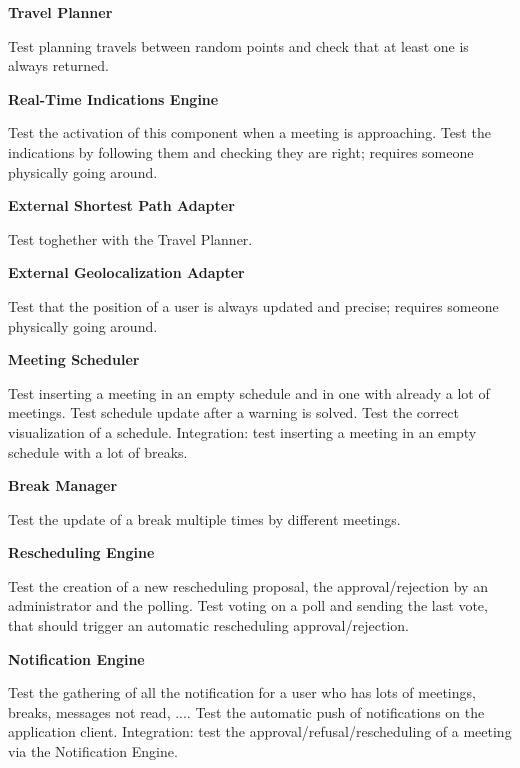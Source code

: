 \textbf{Travel Planner}

Test planning travels between random points and check that at least one is always returned.

\textbf{Real-Time Indications Engine}

Test the activation of this component when a meeting is approaching.
Test the indications by following them and checking they are right; requires someone physically going around.

\textbf{External Shortest Path Adapter}

Test toghether with the Travel Planner.

\textbf{External Geolocalization Adapter}

Test that the position of a user is always updated and precise; requires someone physically going around.

\textbf{Meeting Scheduler}

Test inserting a meeting in an empty schedule and in one with already a lot of meetings.
Test schedule update after a warning is solved.
Test the correct visualization of a schedule.
Integration: test inserting a meeting in an empty schedule with a lot of breaks.

\textbf{Break Manager}

Test the update of a break multiple times by different meetings.

\textbf{Rescheduling Engine}

Test the creation of a new rescheduling proposal, the approval/rejection by an administrator and the polling.
Test voting on a poll and sending the last vote, that should trigger an automatic rescheduling approval/rejection.

\textbf{Notification Engine}

Test the gathering of all the notification for a user who has lots of meetings, breaks, messages not read, ....
Test the automatic push of notifications on the application client.
Integration: test the approval/refusal/rescheduling of a meeting via the Notification Engine.